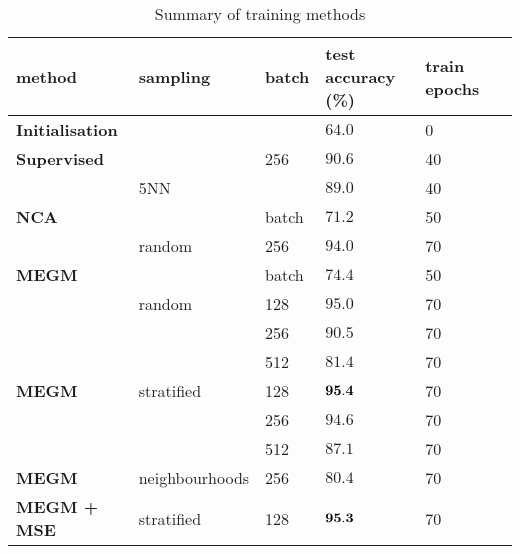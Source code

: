 \begin{table*}[ht]

\centering
  \caption{Summary of training methods}

  \begin{tabular}{  l l  l  l l l }
  
    \toprule
    method &  sampling & batch  & test accuracy (\%) &  train epochs \\  \hline
    \bf{Initialisation} & &  &  $ 64.0  $ & 0  &  \\  
    \hline
    
    \bf{Supervised} & & 256 &  $ 90.6  $ & 40  &  \\  
     & 5NN  &  &  $ 89.0  $ & 40 &  \\  
     \hline
    
    \bf{NCA} &  & batch &  $  71.2  $ &  50  & \\
     & random & 256 & $  94.0  $ & 70 & \\
    
    \hline
    
    \bf{MEGM} &  & batch  &  $  74.4  $ &  50  & \\
     & random & 128 &  $  95.0  $ &  70  & \\     
     &  & 256 & $  90.5  $ &  70 & \\  
     &  & 512 & $  81.4  $ &  70 & \\
    
    \hline
    \bf{MEGM} & stratified & 128 & $  {\bf 95.4 }  $ & 70 & \\  
    
     &  & 256 & $  94.6  $ & 70 & \\  
     &  & 512 & $  87.1  $ & 70 & \\  

     \hline
     
    \bf{MEGM} & neighbourhoods & 256 & $  80.4  $ & 70  & \\
    
    \hline
    
    \bf{MEGM + MSE} & stratified & 128 & $  {\bf 95.3 }  $ & 70  & \\

      \bottomrule
    
    \end{tabular}
\label{fig:metric_summary}
\end{table*}



